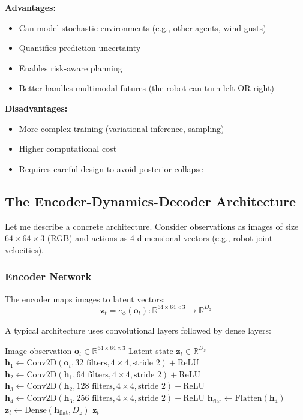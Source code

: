 \textbf{Advantages:}
\begin{itemize}
    \item Can model stochastic environments (e.g., other agents, wind gusts)
    \item Quantifies prediction uncertainty
    \item Enables risk-aware planning
    \item Better handles multimodal futures (the robot can turn left OR right)
\end{itemize}

\textbf{Disadvantages:}
\begin{itemize}
    \item More complex training (variational inference, sampling)
    \item Higher computational cost
    \item Requires careful design to avoid posterior collapse
\end{itemize}

\subsection{The Encoder-Dynamics-Decoder Architecture}

Let me describe a concrete architecture. Consider observations as images of size $64 \times 64 \times 3$ (RGB) and actions as 4-dimensional vectors (e.g., robot joint velocities).

\subsubsection{Encoder Network}

The encoder maps images to latent vectors:
\begin{equation}
\mathbf{z}_t = e_\phi(\mathbf{o}_t): \mathbb{R}^{64 \times 64 \times 3} \to \mathbb{R}^{D_z}
\end{equation}

A typical architecture uses convolutional layers followed by dense layers:

\begin{algorithm}[H]
\caption{Convolutional Encoder Architecture}
\begin{algorithmic}[1]
\Require Image observation $\mathbf{o}_t \in \mathbb{R}^{64 \times 64 \times 3}$
\Ensure Latent state $\mathbf{z}_t \in \mathbb{R}^{D_z}$
\State $\mathbf{h}_1 \gets \text{Conv2D}(\mathbf{o}_t, 32 \text{ filters}, 4\times4, \text{stride } 2) + \text{ReLU}$
\State $\mathbf{h}_2 \gets \text{Conv2D}(\mathbf{h}_1, 64 \text{ filters}, 4\times4, \text{stride } 2) + \text{ReLU}$
\State $\mathbf{h}_3 \gets \text{Conv2D}(\mathbf{h}_2, 128 \text{ filters}, 4\times4, \text{stride } 2) + \text{ReLU}$
\State $\mathbf{h}_4 \gets \text{Conv2D}(\mathbf{h}_3, 256 \text{ filters}, 4\times4, \text{stride } 2) + \text{ReLU}$
\State $\mathbf{h}_{\text{flat}} \gets \text{Flatten}(\mathbf{h}_4)$
\State $\mathbf{z}_t \gets \text{Dense}(\mathbf{h}_{\text{flat}}, D_z)$
\State \Return $\mathbf{z}_t$
\end{algorithmic}
\end{algorithm}

